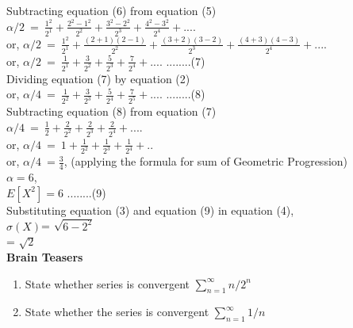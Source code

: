 \documentclass{llncs}
\begin{document}
Subtracting equation (6) from equation (5)\\

$\alpha/2\ =\ \frac{1^2}{2^1} + \frac{2^2-1^2}{2^2} + \frac{3^2-2^2}{2^3} + \frac{4^2-3^2}{2^4} + .... $    \\


or, $\alpha/2\ =\ \frac{1^2}{2^1} + \frac{(2+1)(2-1)}{2^2} + \frac{(3+2)(3-2)}{2^3} + \frac{(4+3)(4-3)}{2^4} + .... $    \\


or, $\alpha/2\ =\ \frac{1}{2^1} + \frac{3}{2^2} + \frac{5}{2^3} + \frac{7}{2^4} + .... $     \hspace{5mm} ........(7)\\	

Dividing equation (7) by equation (2)\\

 or, $\alpha/4\ =\ \frac{1}{2^2} + \frac{3}{2^3} + \frac{5}{2^4} + \frac{7}{2^5} + .... $  \hspace{5mm} ........(8)\\
 
 Subtracting equation (8) from equation (7)\\
 
$\alpha/4\ =\ \frac{1}{2} + \frac{2}{2^2} + \frac{2}{2^3} + \frac{2}{2^4} + .... $\\

or, $\alpha/4\ =\ 1 + \frac{1}{2^2} + \frac{1}{2^3} + \frac{1}{2^4} + .. $\\ 

or, $\alpha/4\ =\frac{3}{4}$, (applying the formula for sum of Geometric Progression)\\

$\alpha = 6$, \\

$E[X^2]=6$	\hspace{5mm} ........(9)\\

Substituting equation (3) and equation (9) in equation (4), \\

$\sigma(X)$=  $ \sqrt{6- 2 ^ 2} $\\

= $\sqrt{2}$\\

	
\textbf{Brain Teasers}
\begin{enumerate}
\item State whether series is convergent $\sum_{n=1}^{\infty} n/2^{n} $
\item State whether the series is convergent $\sum_{n=1}^{\infty} 1/n$ 
\end{enumerate}
\end{document}

